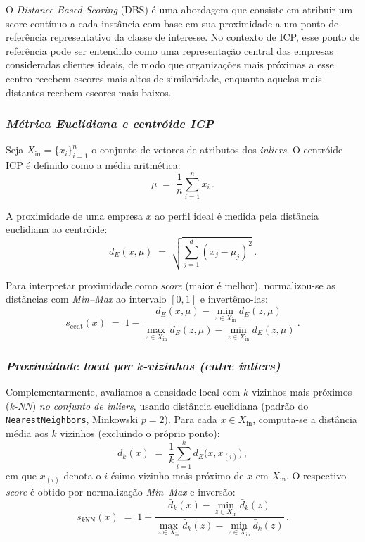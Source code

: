 O \textit{Distance-Based Scoring} (DBS) é uma abordagem que consiste em
atribuir um score contínuo a cada instância com base em sua proximidade
a um ponto de referência representativo da classe de interesse. No
contexto de ICP, esse ponto de referência pode ser entendido como uma
representação central das empresas consideradas clientes ideais, de modo
que organizações mais próximas a esse centro recebem escores mais altos
de similaridade, enquanto aquelas mais distantes recebem escores mais
baixos.

\subsubsection{\textit{Métrica Euclidiana e centróide ICP}}

Seja $X_{\text{in}}=\{x_i\}_{i=1}^{n}$ o conjunto de vetores de atributos dos
\textit{inliers}. O centróide ICP é definido como a média aritmética:
\begin{equation}
\mu \;=\; \frac{1}{n}\sum_{i=1}^{n} x_i\, .
\end{equation}

A proximidade de uma empresa $x$ ao perfil ideal é medida pela distância
euclidiana ao centróide:
\begin{equation}
d_E(x,\mu)\;=\;\sqrt{\sum_{j=1}^{d}(x_j-\mu_j)^2}\, .
\end{equation}

Para interpretar proximidade como \textit{score} (maior é melhor),
normalizou-se as distâncias com \textit{Min–Max} ao intervalo $[0,1]$ e
invertêmo-las:
\begin{equation}
s_{\text{cent}}(x)\;=\;1-\frac{d_E(x,\mu)-\min\limits_{z\in X_{\text{in}}} d_E(z,\mu)}
{\max\limits_{z\in X_{\text{in}}} d_E(z,\mu)-\min\limits_{z\in X_{\text{in}}} d_E(z,\mu)}\, .
\end{equation}


\subsubsection{\textit{Proximidade local por $k$-vizinhos (entre inliers)}}

Complementarmente, avaliamos a densidade local com $k$-vizinhos mais
próximos (\textit{k-NN}) \emph{no conjunto de inliers}, usando distância
euclidiana (padrão do \texttt{NearestNeighbors}, Minkowski $p{=}2$). Para cada
$x\in X_{\text{in}}$, computa-se a distância média aos $k$ vizinhos (excluindo
o próprio ponto):
\begin{equation}
\bar{d}_{k}(x)\;=\;\frac{1}{k}\sum_{i=1}^{k} d_E\!\big(x,x_{(i)}\big)\, ,
\end{equation}
em que $x_{(i)}$ denota o $i$-ésimo vizinho mais próximo de $x$ em
$X_{\text{in}}$. O respectivo \textit{score} é obtido por normalização
\textit{Min–Max} e inversão:
\begin{equation}
s_{k\text{NN}}(x)\;=\;1-\frac{\bar{d}_{k}(x)-\min\limits_{z\in X_{\text{in}}} \bar{d}_{k}(z)}
{\max\limits_{z\in X_{\text{in}}} \bar{d}_{k}(z)-\min\limits_{z\in X_{\text{in}}} \bar{d}_{k}(z)}\, .
\end{equation}

